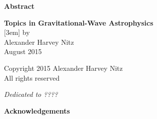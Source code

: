 
\newpage


\thispagestyle{empty}
\begin{center}
{\bf\Large Abstract}\\[0.5em]
\end{center}

\begin{quote}

\end{quote}

\newpage
\thispagestyle{empty}
\begin{center}
{\bf\LARGE Topics in Gravitational-Wave Astrophysics}\\
[3em]
 by\\[1em]
{\large Alexander Harvey Nitz}\\[1em]

{August 2015}\\[5em]
\end{center}%


\newpage
\thispagestyle{empty}
\begin{center}
\vspace*{3in}
Copyright 2015 Alexander Harvey Nitz\\[1.5em]
All rights reserved
\end{center}





\newpage
\thispagestyle{empty}
\begin{flushright}
{\em Dedicated to ????}
\end{flushright}


%

%
\newpage
\begin{center}
{\bf\Large Acknowledgements}
\end{center}


    
\newpage
    \tableofcontents
\newpage
    \listoffigures






%
